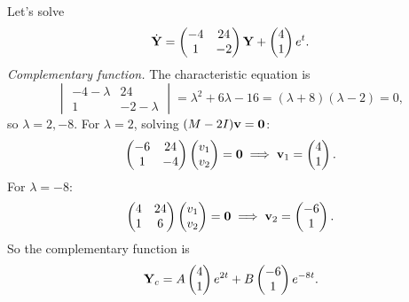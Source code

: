 \documentclass[a4paper]{scrartcl}
\begin{document}
\begin{example}
	Let's solve
	$$
	\dot{\mathbf{Y}} = \begin{pmatrix} -4 & 24 \\ 1 & -2 \end{pmatrix} \mathbf{Y} + \begin{pmatrix} 4 \\ 1 \end{pmatrix} e^t.
	$$
	\emph{Complementary function.} The characteristic equation is
	$$
	\begin{vmatrix} -4 - \lambda & 24 \\ 1 & -2 - \lambda \end{vmatrix} = \lambda^2 + 6\lambda - 16 = (\lambda + 8)(\lambda - 2) = 0,
	$$
	so $\lambda = 2, -8$. For $\lambda = 2$, solving $(M - 2I)\mathbf{v} = \mathbf{0}$:
	$$
	\begin{pmatrix} -6 & 24 \\ 1 & -4 \end{pmatrix}\begin{pmatrix} v_1 \\ v_2\end{pmatrix} = \mathbf{0} \implies \mathbf{v}_1 = \begin{pmatrix} 4 \\ 1 \end{pmatrix}.
	$$
	For $\lambda = -8$:
	$$
	\begin{pmatrix} 4 & 24 \\ 1 & 6 \end{pmatrix} \begin{pmatrix} v_1 \\ v_2 \end{pmatrix} = \mathbf{0} \implies \mathbf{v}_2 = \begin{pmatrix} -6 \\ 1 \end{pmatrix}.
	$$
	So the complementary function is
	$$
	\mathbf{Y}_c = A \begin{pmatrix} 4 \\ 1\end{pmatrix} e^{2t} + B \begin{pmatrix} -6 \\ 1 \end{pmatrix} e^{-8t}.
	$$


\end{example}
\end{document}

